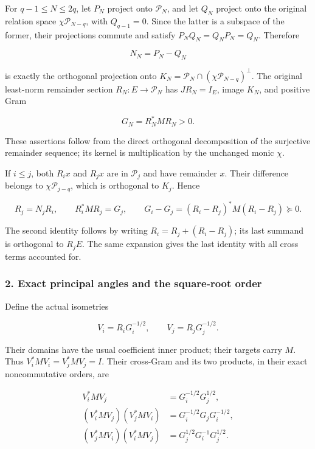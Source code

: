 \documentclass{article}
\begin{document}
For \(q-1\le N\le2q\), let \(P_N\) project onto \(\mathcal P_N\), and let \(Q_N\) project onto the original relation space \(\chi\mathcal P_{N-q}\), with \(Q_{q-1}=0\). Since the latter is a subspace of the former, their projections commute and satisfy \(P_NQ_N=Q_NP_N=Q_N\). Therefore

\[
N_N=P_N-Q_N
\tag{PA2}
\]

is exactly the orthogonal projection onto \(K_N=\mathcal P_N\cap(\chi\mathcal P_{N-q})^\perp\). The original least-norm remainder section \(R_N:E\to\mathcal P_N\) has \(JR_N=I_E\), image \(K_N\), and positive Gram

\[
G_N=R_N^*MR_N>0.
\tag{PA3}
\]

These assertions follow from the direct orthogonal decomposition of the surjective remainder sequence; its kernel is multiplication by the unchanged monic \(\chi\).

If \(i\le j\), both \(R_i x\) and \(R_jx\) are in \(\mathcal P_j\) and have remainder \(x\). Their difference belongs to \(\chi\mathcal P_{j-q}\), which is orthogonal to \(K_j\). Hence

\[
\boxed{R_j=N_jR_i},\qquad
R_i^*MR_j=G_j,
\qquad
G_i-G_j=(R_i-R_j)^*M(R_i-R_j)\succeq0.
\tag{PA4}
\]

The second identity follows by writing \(R_i=R_j+(R_i-R_j)\); its last summand is orthogonal to \(R_jE\). The same expansion gives the last identity with all cross terms accounted for.

\subsubsection{2. Exact principal angles and the square-root order}\label{endpoint-principal_angle_volume_review--exact-principal-angles-and-the-square-root-order}

Define the actual isometries

\[
V_i=R_iG_i^{-1/2},\qquad V_j=R_jG_j^{-1/2}.
\tag{PA5}
\]

Their domains have the usual coefficient inner product; their targets carry \(M\). Thus \(V_i^*MV_i=V_j^*MV_j=I\). Their cross-Gram and its two products, in their exact noncommutative orders, are

\[
\begin{aligned}
V_i^*MV_j&=G_i^{-1/2}G_j^{1/2},\\
(V_i^*MV_j)(V_j^*MV_i)
&=G_i^{-1/2}G_jG_i^{-1/2},\\
(V_j^*MV_i)(V_i^*MV_j)
&=G_j^{1/2}G_i^{-1}G_j^{1/2}.
\end{aligned}
\tag{PA6}
\]
\end{document}
